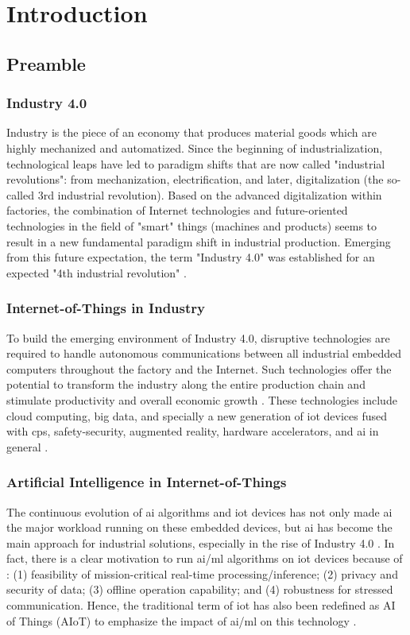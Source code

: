 \chapter{Introduction}\label{chap.intro}
\minitoc
\section{Preamble}
\subsection{Industry 4.0}
Industry is the piece of an economy that produces material goods which are highly mechanized and automatized. Since the beginning of industrialization, technological leaps have led to paradigm shifts that are now called "industrial revolutions": from mechanization, electrification, and later, digitalization (the so-called 3rd industrial revolution). Based on the advanced digitalization within factories, the combination of Internet technologies and future-oriented technologies in the field of "smart" things (machines and products) seems to result in a new fundamental paradigm shift in industrial production. Emerging from this future expectation, the term "Industry 4.0" was established for an expected "4th industrial revolution" \cite{lasi2014industry}.


\subsection{Internet-of-Things in Industry}
To build the emerging environment of Industry 4.0, disruptive technologies are required to handle autonomous communications between all industrial embedded computers throughout the factory and the Internet. Such technologies offer the potential to transform the industry along the entire production chain and stimulate productivity and overall economic growth \cite{espinoza2020estimating}. These technologies include cloud computing, big data, and specially a new generation of \gls{iot} devices fused with \gls{cps}, safety-security, augmented reality, hardware accelerators, and \gls{ai} in general \cite{alcacer2019scanning}.

\subsection{Artificial Intelligence in Internet-of-Things}
The continuous evolution of \gls{ai} algorithms and \gls{iot} devices has not only made \gls{ai} the major workload running on these embedded devices, but \gls{ai} has become the main approach for industrial solutions, especially in the rise of Industry 4.0 \cite{alcacer2019scanning}. In fact, there is a clear motivation to run \gls{ai}/\gls{ml} algorithms on \gls{iot} devices because of \cite{loh20201}: (1) feasibility of mission-critical real-time processing/inference; (2) privacy and security of data; (3) offline operation capability; and (4) robustness for stressed communication. Hence, the traditional term of \gls{iot} has also been redefined as AI of Things (AIoT) to emphasize the impact of \gls{ai}/\gls{ml} on this technology \cite{zhang2020empowering}.

